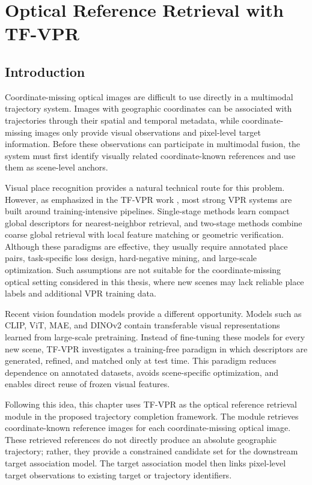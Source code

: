 \chapter{Optical Reference Retrieval with TF-VPR}

\section{Introduction}
Coordinate-missing optical images are difficult to use directly in a multimodal trajectory system. Images with geographic coordinates can be associated with trajectories through their spatial and temporal metadata, while coordinate-missing images only provide visual observations and pixel-level target information. Before these observations can participate in multimodal fusion, the system must first identify visually related coordinate-known references and use them as scene-level anchors.

Visual place recognition provides a natural technical route for this problem. However, as emphasized in the TF-VPR work \cite{wang2026tfvpr}, most strong VPR systems are built around training-intensive pipelines. Single-stage methods learn compact global descriptors for nearest-neighbor retrieval, and two-stage methods combine coarse global retrieval with local feature matching or geometric verification. Although these paradigms are effective, they usually require annotated place pairs, task-specific loss design, hard-negative mining, and large-scale optimization. Such assumptions are not suitable for the coordinate-missing optical setting considered in this thesis, where new scenes may lack reliable place labels and additional VPR training data.

Recent vision foundation models provide a different opportunity. Models such as CLIP, ViT, MAE, and DINOv2 contain transferable visual representations learned from large-scale pretraining. Instead of fine-tuning these models for every new scene, TF-VPR investigates a training-free paradigm in which descriptors are generated, refined, and matched only at test time. This paradigm reduces dependence on annotated datasets, avoids scene-specific optimization, and enables direct reuse of frozen visual features.

Following this idea, this chapter uses TF-VPR as the optical reference retrieval module in the proposed trajectory completion framework. The module retrieves coordinate-known reference images for each coordinate-missing optical image. These retrieved references do not directly produce an absolute geographic trajectory; rather, they provide a constrained candidate set for the downstream target association model. The target association model then links pixel-level target observations to existing target or trajectory identifiers.

